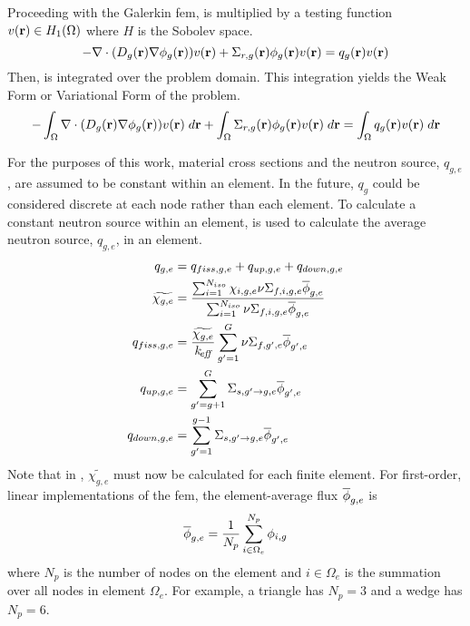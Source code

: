     Proceeding with the Galerkin \gls{fem},  is
    multiplied by a testing function $v(\mathbf{r}) \in H_1(\Omega)$ where $H$ is the
    Sobolev space. 
    \begin{equation}
      \label{eq:testing_function_multiply}
      -\mathbf{\nabla} \cdot (D_g(\mathbf{r}) \mathbf{\nabla} \phi_g(\mathbf{r})) v(\mathbf{r}) + 
        \Sigma_{r,g}(\mathbf{r}) \phi_g(\mathbf{r}) v(\mathbf{r}) =
        q_g(\mathbf{r}) v(\mathbf{r})
    \end{equation}
    Then,  is integrated over the problem 
    domain. This integration yields the Weak Form or Variational Form of the 
    problem.
    \begin{equation}
      \label{eq:fem_weak_form}
      - \int_{\Omega} \mathbf{\nabla} \cdot (D_g(\mathbf{r}) \mathbf{\nabla} \phi_g(\mathbf{r})) v(\mathbf{r}) \; d\mathbf{r}
        + \int_{\Omega} \Sigma_{r,g}(\mathbf{r}) \phi_g(\mathbf{r}) v(\mathbf{r}) \;d\mathbf{r}=
        \int_{\Omega} q_g(\mathbf{r}) v(\mathbf{r}) \;d\mathbf{r}
    \end{equation}
    
    For the purposes of this work, material cross sections and the neutron
    source, $q_{g,e}$, are assumed to be constant within an element. In the
    future, $q_g$ could be considered discrete at each node rather than each
    element. To calculate a constant neutron source within an element,
     is used to calculate the average neutron source, $q_{g,e}$,
    in an element.
    \begin{align}
      q_{g,e} &= q_{fiss,g,e} + q_{up,g,e} + q_{down,g,e} \\
      \label{eq:chielement}
      \widetilde{\chi_{g,e}} &= \frac{\sum_{i=1}^{N_{iso}} \chi_{i,g,e}
        \nu \Sigma_{f,i,g,e} \overline{\phi}_{g,e}}
        {\sum_{i=1}^{N_{iso}} \nu \Sigma_{f,i,g,e} \overline{\phi}_{g,e}} \\
      \label{eq:qelement_fiss}
      q_{fiss,g,e} &= \frac{\widetilde{\chi_{g,e}}}{k_{\!\mbox{\scriptsize \em eff}}} \sum_{g'=1}^G \nu
        \Sigma_{f,g',e} \overline{\phi}_{g',e} \\
      \label{eq:qelement_up}
      q_{up,g,e} &= \sum_{g'=g+1}^G \Sigma_{s,g' \rightarrow g,e}
        \overline{\phi}_{g',e}\\
      \label{eq:qelement_down}
      q_{down,g,e} &= \sum_{g'=1}^{g-1} \Sigma_{s,g' \rightarrow g,e}
        \overline{\phi}_{g',e}
    \end{align}
    Note that in , $\widetilde{\chi_{g,e}}$ must now be
    calculated for each finite element.  For first-order, linear implementations
    of the \gls{fem}, the element-average flux $\overline{\phi}_{g,e}$ is
    \begin{equation}
      \label{eq:phiavg}
      \overline{\phi}_{g,e} = \frac{1}{N_p} \sum_{i \in \Omega_e}^{N_p} \phi_{i,g}
    \end{equation}
    where $N_p$ is the number of nodes on the element and $i \in
    \Omega_e$ is the summation over all nodes in element $\Omega_e$. For 
    example, a triangle has $N_p = 3$ and a wedge has $N_p = 6$.

